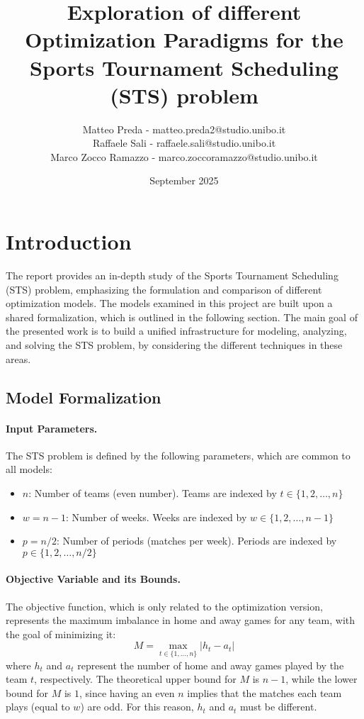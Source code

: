 \documentclass{article}
\title{ \textbf{Exploration of different Optimization Paradigms for the Sports Tournament Scheduling (STS) problem}}
\author{Matteo Preda - matteo.preda2@studio.unibo.it \\ Raffaele Sali - raffaele.sali@studio.unibo.it \\ Marco Zocco Ramazzo - marco.zoccoramazzo@studio.unibo.it}
\date{September 2025}
\begin{document}
\maketitle

\section{Introduction}
The report provides an in-depth study of the Sports Tournament Scheduling (STS) problem, emphasizing the formulation and comparison of different optimization models. The models examined in this project are built upon a shared formalization, which is outlined in the following section. The main goal of the presented work is to build a unified infrastructure for modeling, analyzing, and solving the STS problem, by considering the different techniques in these areas.  

\subsection{Model Formalization}

\paragraph{Input Parameters.}
The STS problem is defined by the following parameters, which are common to all models:
\begin{itemize}
    \item $n$: Number of teams (even number). Teams are indexed by $t \in \{1, 2, \ldots, n\}$ 
    \item $w = n-1$: Number of weeks. Weeks are indexed by $w \in \{1, 2, \ldots, n-1\}$
    \item $p = n/2$: Number of periods (matches per week). Periods are indexed by $p \in \{1, 2, \ldots, n/2\}$
\end{itemize}

\paragraph{Objective Variable and its Bounds.}
The objective function, which is only related to the optimization version, represents the maximum imbalance in home and away games for any team, with the goal of minimizing it:
\[
M = \max_{t \in \{1, \ldots, n\}} |h_t - a_t|
\]
where $h_t$ and $a_t$ represent the number of home and away games played by the team $t$, respectively. 
The theoretical upper bound for $M$ is $n-1$, while the lower bound for $M$ is $1$, since having an even $n$ implies that the matches each team plays (equal to $w$) are odd. For this reason, $h_t$ and $a_t$ must be different.
\end{document}
